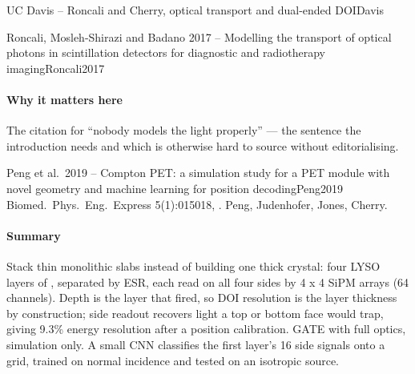 \begin{programnote}{UC Davis -- Roncali and Cherry, optical transport and dual-ended DOI}{Davis}
\begin{papernote}{Roncali, Mosleh-Shirazi and Badano 2017 -- Modelling the transport of optical photons in scintillation detectors for diagnostic and radiotherapy imaging}{Roncali2017}
\paragraph{Why it matters here}
The citation for ``nobody models the light properly'' --- the sentence the
introduction needs and which is otherwise hard to source without editorialising.

\end{papernote}

\begin{papernote}{Peng et al.\ 2019 -- Compton PET: a simulation study for a PET module with novel geometry and machine learning for position decoding}{Peng2019}
Biomed.\ Phys.\ Eng.\ Express 5(1):015018, .
Peng, Judenhofer, Jones, Cherry.

\paragraph{Summary}
Stack thin monolithic slabs instead of building one thick crystal: four LYSO
layers of , separated by ESR, each read on
all four sides by 4 x 4 SiPM arrays (64 channels). Depth is the layer that
fired, so DOI resolution is the layer thickness by construction; side readout
recovers light a top or bottom face would trap, giving 9.3\% energy resolution
after a position calibration. GATE with full optics, simulation only. A small
CNN classifies the first layer's 16 side signals onto a  grid, trained
on normal incidence and tested on an isotropic source.


\end{papernote}
\end{programnote}
